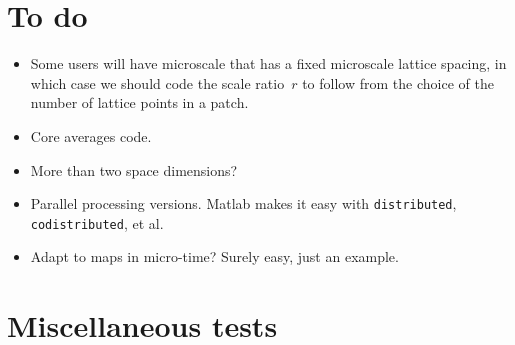 


\begin{devMan}





\section{To do}
\begin{itemize}
\item Some users will have microscale that has a fixed microscale lattice spacing, in which case we should code the scale ratio~\(r\) to follow from the choice of the number of lattice points in a patch.
\item Core averages code.
\item More than two space dimensions?
\item Parallel processing versions.  Matlab makes it easy with \verb|distributed|, \verb|codistributed|, et al.
\item Adapt to maps in micro-time?  Surely easy, just an example.
\end{itemize}


\section{Miscellaneous tests}




\end{devMan}
